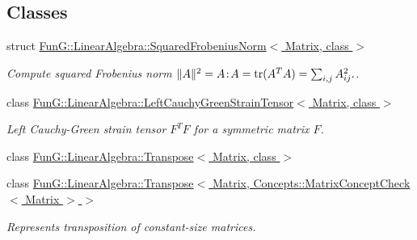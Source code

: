 \subsection*{Classes}
\begin{DoxyCompactItemize}
\item 
struct \hyperlink{structFunG_1_1LinearAlgebra_1_1SquaredFrobeniusNorm}{Fun\+G\+::\+Linear\+Algebra\+::\+Squared\+Frobenius\+Norm$<$ Matrix, class $>$}
\begin{DoxyCompactList}\small\item\em Compute squared Frobenius norm $ \|A\|^2 = A\negthinspace : \negthinspace A = \mathrm{tr}(A^TA) = \sum_{i,j} A_{ij}^2. $. \end{DoxyCompactList}\item 
class \hyperlink{classFunG_1_1LinearAlgebra_1_1LeftCauchyGreenStrainTensor}{Fun\+G\+::\+Linear\+Algebra\+::\+Left\+Cauchy\+Green\+Strain\+Tensor$<$ Matrix, class $>$}
\begin{DoxyCompactList}\small\item\em Left Cauchy-\/\+Green strain tensor $ F^T F $ for a symmetric matrix $ F $. \end{DoxyCompactList}\item 
class \hyperlink{classFunG_1_1LinearAlgebra_1_1Transpose}{Fun\+G\+::\+Linear\+Algebra\+::\+Transpose$<$ Matrix, class $>$}
\item 
class \hyperlink{classFunG_1_1LinearAlgebra_1_1Transpose_3_01Matrix_00_01Concepts_1_1MatrixConceptCheck_3_01Matrix_01_4_01_4}{Fun\+G\+::\+Linear\+Algebra\+::\+Transpose$<$ Matrix, Concepts\+::\+Matrix\+Concept\+Check$<$ Matrix $>$ $>$}
\begin{DoxyCompactList}\small\item\em Represents transposition of constant-\/size matrices. \end{DoxyCompactList}\end{DoxyCompactItemize}
